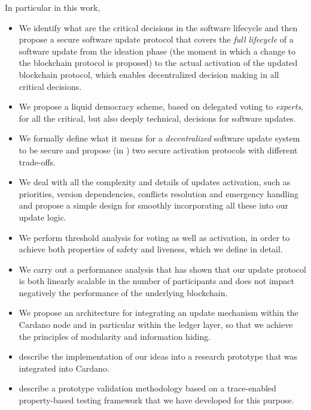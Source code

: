 In particular in this work,
\begin{itemize}
  \item We identify what are the critical decisions in the software lifecycle
	 and then propose a secure software update protocol that covers the
	\emph{full lifecycle} of a software update from the ideation phase (the
	moment in which a change to the blockchain protocol is proposed) to the
	actual activation of the updated blockchain protocol, which enables
	decentralized decision making in all critical decisions.
	\item We propose a liquid democracy scheme, based on delegated voting to
	\emph{experts}, for all the critical, but also deeply technical, decisions
	for software updates.
	\item We formally define what it means for a \emph{decentralized} software
	update system to be secure and propose (in \cite{secure_activation}) two
	secure 	activation protocols with different trade-offs.
	\item We deal with all the complexity and details of updates activation,
	such as priorities, version dependencies, conflicts resolution and
	emergency handling
	and propose	a simple design for smoothly incorporating all these into
	our update logic.
	\item We perform threshold analysis for voting as well as activation, in
	order to 	achieve both properties of safety and liveness, which we define
	in detail.
	\item We carry out a performance analysis that has shown that our update
  protocol is both linearly scalable in the number of participants and does not
  impact negatively the performance of the underlying blockchain.
	\item We propose an architecture for integrating an update mechanism within
	the Cardano node \cite{cardano} and in particular within the ledger layer,
	so that we
	achieve the principles of modularity and information hiding.
  \item describe the implementation of our ideas into a research prototype that
  was integrated into Cardano.
  \item describe a prototype validation methodology based on a trace-enabled
	property-based testing framework that we have developed for this purpose.
\end{itemize}

